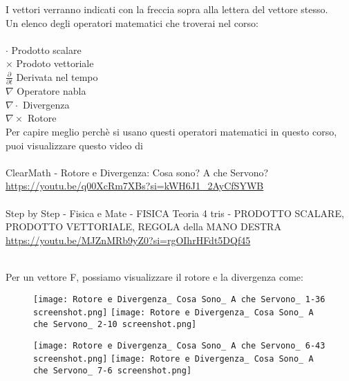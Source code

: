 \begin{tcolorbox}
    I vettori verranno indicati con la freccia sopra alla lettera del vettore stesso. \\ 
    Un elenco degli operatori matematici che troverai nel corso: \\ \\ 
    
    $\cdot$ Prodotto scalare \\ 
    $\times$ Prodoto vettoriale \\ 
    $\frac{\partial}{\partial t}$ Derivata nel tempo \\ 
    $\nabla$ Operatore nabla \\ 
    $\nabla \cdot$ Divergenza \\  
    $\nabla \times $ Rotore \\ 

    Per capire meglio perchè si usano questi operatori matematici in questo corso, puoi visualizzare questo video di \\\\  
    ClearMath - Rotore e Divergenza: Cosa sono? A che Servono? \\ 
    \url{https://youtu.be/q00XcRm7XBs?si=kWH6J1_2AyCfSYWB} \\\\ 
        
    Step by Step - Fisica e Mate - FISICA Teoria 4 tris - PRODOTTO SCALARE, PRODOTTO VETTORIALE, REGOLA della MANO DESTRA \\ 
    \url{https://youtu.be/MJZnMRb9yZ0?si=rgOIhrHFdt5DQf45} \\\\  


\end{tcolorbox}


Per un vettore F, possiamo visualizzare il rotore e la divergenza come: 


\begin{figure}[h]
    \centering
    \texttt{[image: Rotore e Divergenza\_ Cosa Sono\_ A che Servono\_ 1-36 screenshot.png]}
    \texttt{[image: Rotore e Divergenza\_ Cosa Sono\_ A che Servono\_ 2-10 screenshot.png]}
    
\end{figure}

\begin{figure}[h]
    \centering
    \texttt{[image: Rotore e Divergenza\_ Cosa Sono\_ A che Servono\_ 6-43 screenshot.png]}
    \texttt{[image: Rotore e Divergenza\_ Cosa Sono\_ A che Servono\_ 7-6 screenshot.png]}
    
\end{figure}


